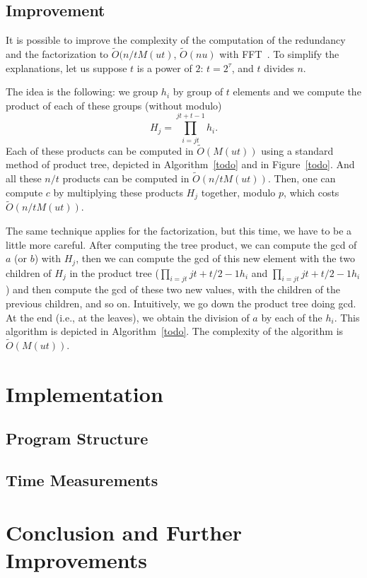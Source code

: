 \documentclass[11pt]{llncs}
\newcommand{\Oapp}{\ensuremath{\tilde{O}}}
\begin{document}
\subsection{Improvement}

It is possible to improve the complexity of the computation of the redundancy and the factorization to $\Oapp(n/t M(u t)$, $\Oapp(n u)$ with FFT~\cite{schonhage1971schnelle}.
To simplify the explanations, let us suppose $t$ is a power of $2$: $t=2^\tau$, and $t$ divides $n$.

The idea is the following: we group $h_i$ by group of $t$ elements and we compute the product of each of these groups (without modulo)
\[ H_j = \prod_{i=j t}^{j t + t - 1} h_i. \]
Each of these products can be computed in $\Oapp(M(u t))$ using a standard method of product tree, depicted in Algorithm~\ref{todo} and in Figure~\ref{todo}.
And all these $n / t$ products can be computed in $\Oapp(n/t M(u t))$.
Then, one can compute $c$ by multiplying these products $H_j$ together, modulo $p$, which costs $\Oapp(n/t M(u t))$.

The same technique applies for the factorization, but this time, we have to be a little more careful.
After computing the tree product, we can compute the gcd of $a$ (or $b$) with $H_j$, then we can compute the gcd of this new element with the two children of $H_j$ in the product tree ($\prod_{i=j t}{j t + t/2 - 1} h_i$ and $\prod_{i=j t}{j t + t/2 - 1} h_i$) and then compute the gcd of these two new values, with the children of the previous children, and so on.
Intuitively, we go down the product tree doing gcd.
At the end (i.e., at the leaves), we obtain the division of $a$ by each of the $h_i$.
This algorithm is depicted in Algorithm~\ref{todo}.
The complexity of the algorithm is $\Oapp(M(u t))$.


\section{Implementation}

\subsection{Program Structure}

\subsection{Time Measurements}

\section{Conclusion and Further Improvements}
\end{document}
